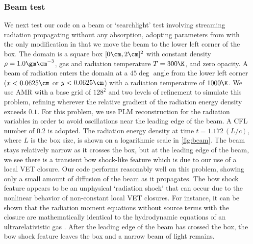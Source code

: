 \documentclass[fleqn,usenatbib]{mnras}
\begin{document}
\subsubsection{Beam test}
\label{ssec:beam}
We next test our code on a beam or `searchlight' test involving streaming radiation propagating without any absorption, adopting parameters from \cite{Gonzalez_2007} with the only modification in that we move the beam to the lower left corner of the box. The domain is a square box $[0 \cm, 2 \cm]^2$ with constant density $\rho = 1.0 \gm \cm^{-3}$, gas and radiation temperature $T = 300 \K$, and zero opacity. A beam of radiation enters the domain at a $45 \deg$ angle from the lower left corner ($x < 0.0625 \cm$ or $y < 0.0625 \cm$) with a radiation temperature of $1000 \K$. We use AMR with a base grid of $128^2$ and two levels of refinement to simulate this problem, refining wherever the relative gradient of the radiation energy density exceeds $0.1$. For this problem, we use PLM reconstruction for the radiation variables in order to avoid oscillations near the leading edge of the beam. A CFL number of $0.2$ is adopted. The radiation energy density at time $t =  1.172 \, (L/c)$, where $L$ is the box size, is shown on a logarithmic scale in \autoref{fig:beam}. The beam stays relatively narrow as it crosses the box, but at the leading edge of the beam, we see there is a transient bow shock-like feature which is due to our use of a local VET closure. Our code performs reasonably well on this problem, showing only a small amount of diffusion of the beam as it propagates. The bow shock feature appears to be an unphysical `radiation shock' that can occur due to the nonlinear behavior of non-constant local VET closures. For instance, it can be shown that the radiation moment equations without source terms with the \cite{Levermore_1984} closure are mathematically identical to the hydrodynamic equations of an ultrarelativistic gas \citep{Hanawa_2014}. After the leading edge of the beam has crossed the box, the bow shock feature leaves the box and a narrow beam of light remains.
\end{document}
